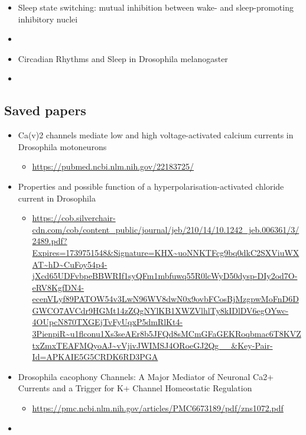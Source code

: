 \documentclass[../workflow.tex]{subfiles}
\begin{document}
\begin{itemize}
    \item Sleep state switching: mutual inhibition between wake- and sleep-promoting
    inhibitory nuclei \item \cite{liuTwoDopaminergicNeurons2012,saperSleepStateSwitching2010}
    
    \item Circadian Rhythms and Sleep in Drosophila melanogaster \item \cite{dubowyCircadianRhythmsSleep2017}

\end{itemize}


\subsection{Saved papers}

\begin{itemize}
    \item Ca(v)2 channels mediate low and high voltage-activated calcium currents in Drosophila motoneurons
    \begin{itemize}
        \item \url{https://pubmed.ncbi.nlm.nih.gov/22183725/}
    \end{itemize}

    \item Properties and possible function of a hyperpolarisation-activated chloride current
    in Drosophila
    \begin{itemize}
        \item \url{https://cob.silverchair-cdn.com/cob/content_public/journal/jeb/210/14/10.1242_jeb.006361/3/2489.pdf?Expires=1739751548&Signature=KHX~uoNNKTFcg9bq0dkC2SXViuWXAT~hD~CuFoy54p4-jXcd65UDFvbpeBBWRIf1syQFm1mbfuwq55R0lcWyD50dysp-DIy2od7O-eRV8KgfDN4-ecenVLyf89PATOW54v3LwN96WV8dwN0x9ovbFCosBjMzgpwMoFnD6DGWCO7AVCdr9HGMt14zZQgNYlKB1XWZVlhlTy8kIDlDV6egOYwc-4OUpcN870TXGEjTvFyUqxP5dmRlKt4-3PienpiR~u1flconu1Xs3seAEr8b5JFQd8sMCmGFaGEKRoqbmac6T8KVZtxZmxTEAFMQyoAJ~vVjivJWIMSJ4ORoeGJ2Qg__&Key-Pair-Id=APKAIE5G5CRDK6RD3PGA}
    \end{itemize}

    \item Drosophila cacophony Channels: A Major Mediator of
    Neuronal Ca2+ Currents and a Trigger for K+ Channel
    Homeostatic Regulation
    \begin{itemize}
        \item \url{https://pmc.ncbi.nlm.nih.gov/articles/PMC6673189/pdf/zns1072.pdf}
    \end{itemize}

    \item

    
\end{itemize}
\end{document}
